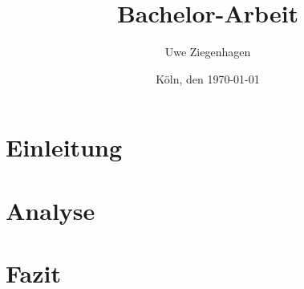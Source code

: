 \documentclass[12pt,ngerman]{scrreport}
\author{Uwe Ziegenhagen}
\title{Bachelor-Arbeit}
\date{Köln, den \today}
\begin{document}
\maketitle

\tableofcontents

\listoffigures

\listoftables

\chapter{Einleitung}

\chapter{Analyse}

\chapter{Fazit}
\end{document}
